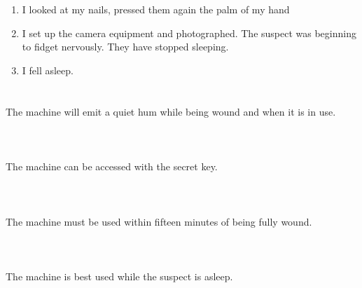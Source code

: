 \documentclass{article}
\begin{document}
    \newpage
    
    \section{}
    
    \begin{enumerate}
    
    \item I looked at my nails, pressed them again the palm of my hand\\
    
    \item I set up the camera equipment and photographed. The suspect was beginning to fidget nervously. They have stopped sleeping.\\
    
    \item I fell asleep.\\
    
    \end{enumerate}
     
    \newpage
    
    \section{}
    The machine will emit a quiet hum while being wound and when it is in use.\\\\ 
    \newpage
    
    \section{}
    The machine can be accessed with the secret key.\\\\ 
    \newpage
    
    \section{}
    The machine must be used within fifteen minutes of being fully wound.\\\\ 
    \newpage
    
    \section{}
    The machine is best used while the suspect is asleep.\\\\ 
    \newpage
    
\end{document}
